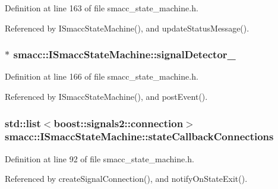 Definition at line 163 of file smacc\+\_\+state\+\_\+machine.\+h.



Referenced by I\+Smacc\+State\+Machine(), and update\+Status\+Message().

\subsubsection[{\texorpdfstring{signal\+Detector\+\_\+}{signalDetector_}}]{$\ast$ smacc\+::\+I\+Smacc\+State\+Machine\+::signal\+Detector\+\_\+\hspace{0.3cm}{\ttfamily [private]}}\hypertarget{classsmacc_1_1ISmaccStateMachine_a3982eb671f5f001cb047d3a467789986}{}\label{classsmacc_1_1ISmaccStateMachine_a3982eb671f5f001cb047d3a467789986}


Definition at line 166 of file smacc\+\_\+state\+\_\+machine.\+h.



Referenced by I\+Smacc\+State\+Machine(), and post\+Event().

\subsubsection[{\texorpdfstring{state\+Callback\+Connections}{stateCallbackConnections}}]{\setlength{\rightskip}{0pt plus 5cm}std\+::list$<$boost\+::signals2\+::connection$>$ smacc\+::\+I\+Smacc\+State\+Machine\+::state\+Callback\+Connections}\hypertarget{classsmacc_1_1ISmaccStateMachine_aaf98bb0edaa5d8c84767e4acfad3548d}{}\label{classsmacc_1_1ISmaccStateMachine_aaf98bb0edaa5d8c84767e4acfad3548d}


Definition at line 92 of file smacc\+\_\+state\+\_\+machine.\+h.



Referenced by create\+Signal\+Connection(), and notify\+On\+State\+Exit().

